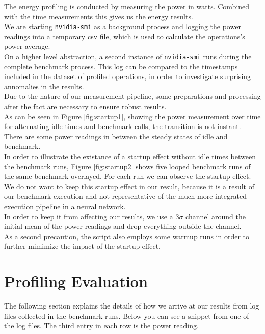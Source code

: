 The energy profiling is conducted by measuring the power in watts. Combined with the time measurements this gives us the energy results. \\
We are starting \texttt{nvidia-smi} as a background process and logging the power readings into a temporary csv file, which is used to calculate the operations's power average. \\
On a higher level abstraction, a second instance of \texttt{nvidia-smi} runs during the complete benchmark process. This log can be compared to the timestamps included in the dataset of profiled operations, in order to investigate surprising annomalies in the results. \\
Due to the nature of our measurement pipeline, some preparations and processing after the fact are necessary to ensure robust results. \\
As can be seen in Figure \ref{fig:startup1}, showing the power measurement over time for alternating idle times and benchmark calls, the transition is not instant. There are some power readings in between the steady states of idle and benchmark. \\
In order to illustrate the existance of a startup effect without idle times between the benchmark runs, Figure \ref{fig:startup2} shows five looped benchmark runs of the same benchmark overlayed. For each run we can observe the startup effect. \\
We do not want to keep this startup effect in our result, because it is a result of our benchmark execution and not representative of the much more integrated execution pipeline in a neural network.\\
In order to keep it from affecting our results, we use a $3\sigma$ channel around the initial mean of the power readings and drop everything outside the channel. \\
As a second precaution, the script also employs some warmup runs in order to further mimimize the impact of the startup effect.\\



\section{Profiling Evaluation}


The following section explains the details of how we arrive at our results from log files collected in the benchmark runs. Below you can see a snippet from one of the log files. The third entry in each row is the power reading.

